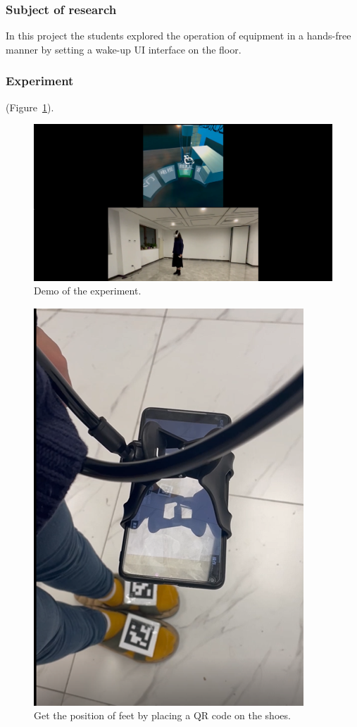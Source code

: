 \subsubsection{Subject of research}

In this project the students explored the operation of equipment in a hands-free manner by setting a wake-up UI interface on the floor.

\subsubsection{Experiment}


(Figure~\ref{fig:Project11-figure}). 

\begin{figure}
  \centering
  \includegraphics[width=0.9\linewidth]{figures/Project_11.png}
  \caption{Demo of the experiment.}
  \label{fig:Project11-figure}
\end{figure}

\begin{figure}
  \centering
  \includegraphics[width=0.6\linewidth]{figures/Project_11_1.png}
  \caption{Get the position of feet by placing a QR code on the shoes.}
  \label{fig:Project11_1-figure}
\end{figure}

